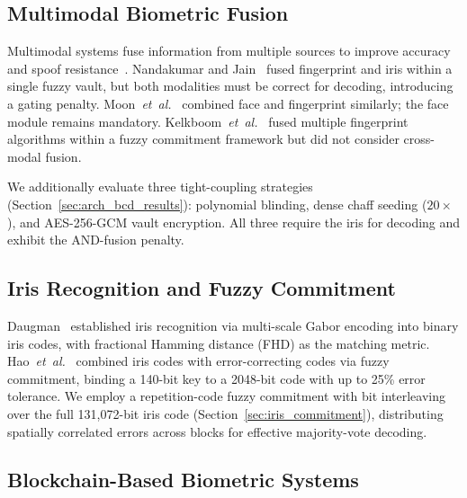 \documentclass[3p,twocolumn]{elsarticle}
\begin{document}
\subsection{Multimodal Biometric Fusion}

Multimodal systems fuse information from multiple sources to improve accuracy and spoof resistance~\cite{ross2003information,jain2004multibiometrics}. Nandakumar and Jain~\cite{nandakumar2008multibiometric} fused fingerprint and iris within a single fuzzy vault, but both modalities must be correct for decoding, introducing a gating penalty. Moon~\textit{et~al.}~\cite{moon2010multibiometric} combined face and fingerprint similarly; the face module remains mandatory. Kelkboom~\textit{et~al.}~\cite{kelkboom2011multialgorithm} fused multiple fingerprint algorithms within a fuzzy commitment framework but did not consider cross-modal fusion.

We additionally evaluate three tight-coupling strategies (Section~\ref{sec:arch_bcd_results}): polynomial blinding, dense chaff seeding ($20\times$), and AES-256-GCM vault encryption. All three require the iris for decoding and exhibit the AND-fusion penalty.

\subsection{Iris Recognition and Fuzzy Commitment}

Daugman~\cite{daugman2004how} established iris recognition via multi-scale Gabor encoding into binary iris codes, with fractional Hamming distance (FHD) as the matching metric. Hao~\textit{et~al.}~\cite{hao2006combining} combined iris codes with error-correcting codes via fuzzy commitment, binding a 140-bit key to a 2048-bit code with up to 25\% error tolerance. We employ a repetition-code fuzzy commitment with bit interleaving over the full 131,072-bit iris code (Section~\ref{sec:iris_commitment}), distributing spatially correlated errors across blocks for effective majority-vote decoding.

\subsection{Blockchain-Based Biometric Systems}
\label{sec:blockchain_bio}
\end{document}
